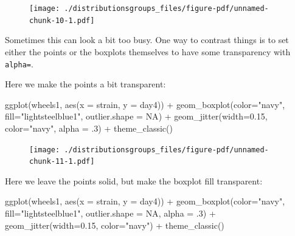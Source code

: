 \documentclass[
  letterpaper,
  DIV=11,
  numbers=noendperiod]{scrreprt}
\newenvironment{Shaded}{\begin{snugshade}}{\end{snugshade}}
\newcommand{\AttributeTok}[1]{\textcolor[rgb]{0.40,0.45,0.13}{#1}}
\newcommand{\ConstantTok}[1]{\textcolor[rgb]{0.56,0.35,0.01}{#1}}
\newcommand{\DecValTok}[1]{\textcolor[rgb]{0.68,0.00,0.00}{#1}}
\newcommand{\FloatTok}[1]{\textcolor[rgb]{0.68,0.00,0.00}{#1}}
\newcommand{\FunctionTok}[1]{\textcolor[rgb]{0.28,0.35,0.67}{#1}}
\newcommand{\NormalTok}[1]{\textcolor[rgb]{0.00,0.23,0.31}{#1}}
\newcommand{\SpecialCharTok}[1]{\textcolor[rgb]{0.37,0.37,0.37}{#1}}
\newcommand{\StringTok}[1]{\textcolor[rgb]{0.13,0.47,0.30}{#1}}
\begin{document}
\begin{figure}[H]

{\centering \texttt{[image: ./distributionsgroups\_files/figure-pdf/unnamed-chunk-10-1.pdf]}

}

\end{figure}

Sometimes this can look a bit too busy. One way to contrast things is to
set either the points or the boxplots themselves to have some
transparency with \texttt{alpha=}.

Here we make the points a bit transparent:

\begin{Shaded}
\begin{Highlighting}[]
\FunctionTok{ggplot}\NormalTok{(wheels1, }\FunctionTok{aes}\NormalTok{(}\AttributeTok{x =}\NormalTok{ strain, }\AttributeTok{y =}\NormalTok{ day4)) }\SpecialCharTok{+} 
  \FunctionTok{geom\_boxplot}\NormalTok{(}\AttributeTok{color=}\StringTok{"navy"}\NormalTok{, }\AttributeTok{fill=}\StringTok{"lightsteelblue1"}\NormalTok{, }\AttributeTok{outlier.shape =} \ConstantTok{NA}\NormalTok{) }\SpecialCharTok{+}
  \FunctionTok{geom\_jitter}\NormalTok{(}\AttributeTok{width=}\FloatTok{0.15}\NormalTok{, }\AttributeTok{color=}\StringTok{"navy"}\NormalTok{, }\AttributeTok{alpha =}\NormalTok{ .}\DecValTok{3}\NormalTok{) }\SpecialCharTok{+}
  \FunctionTok{theme\_classic}\NormalTok{()}
\end{Highlighting}
\end{Shaded}

\begin{figure}[H]

{\centering \texttt{[image: ./distributionsgroups\_files/figure-pdf/unnamed-chunk-11-1.pdf]}

}

\end{figure}

Here we leave the points solid, but make the boxplot fill transparent:

\begin{Shaded}
\begin{Highlighting}[]
\FunctionTok{ggplot}\NormalTok{(wheels1, }\FunctionTok{aes}\NormalTok{(}\AttributeTok{x =}\NormalTok{ strain, }\AttributeTok{y =}\NormalTok{ day4)) }\SpecialCharTok{+} 
  \FunctionTok{geom\_boxplot}\NormalTok{(}\AttributeTok{color=}\StringTok{"navy"}\NormalTok{, }\AttributeTok{fill=}\StringTok{"lightsteelblue1"}\NormalTok{, }\AttributeTok{outlier.shape =} \ConstantTok{NA}\NormalTok{, }\AttributeTok{alpha =}\NormalTok{ .}\DecValTok{3}\NormalTok{) }\SpecialCharTok{+}
  \FunctionTok{geom\_jitter}\NormalTok{(}\AttributeTok{width=}\FloatTok{0.15}\NormalTok{, }\AttributeTok{color=}\StringTok{"navy"}\NormalTok{) }\SpecialCharTok{+}
  \FunctionTok{theme\_classic}\NormalTok{()}
\end{Highlighting}
\end{Shaded}
\end{document}
